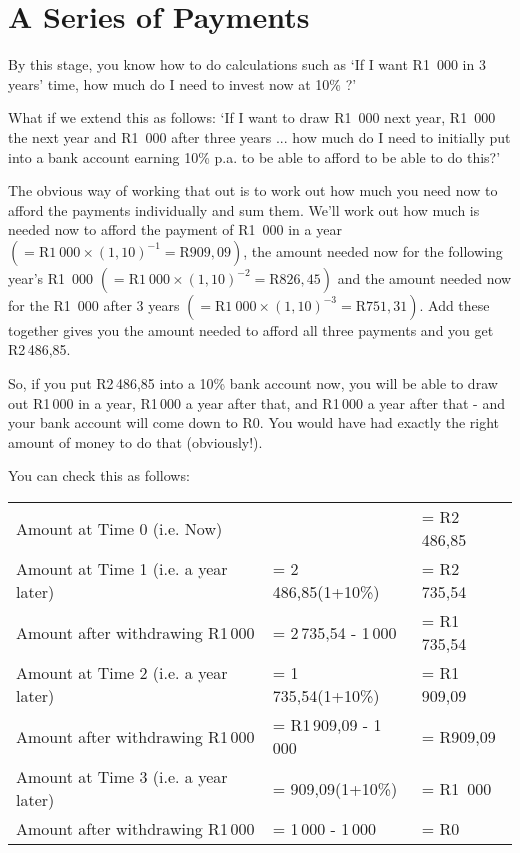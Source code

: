 \section{A Series of Payments}

By this stage, you know how to do calculations such as `If I want R1~000 in 3 years' time, how much do I need to invest now at 10\% ?'

What if we extend this as follows: `If I want to draw R1~000 next year, R1~000 the next year and R1~000 after three years ... how much do I need to initially put into a bank account earning 10\% p.a. to be able to afford to be able to do this?'

The obvious way of working that out is to work out how much you need now to afford the payments individually and sum them. We'll work out how much is needed now to afford the payment of R1~000 in a year $(= \textrm{R}1~000\times (1,10)^{-1} = \textrm{R}909,09)$, the amount needed now for the following year's R1~000 $(=\textrm{R}1~000\times (1,10)^{-2} = \textrm{R}826,45)$ and the amount needed now for the R1~000 after 3 years $(=\textrm{R}1~000\times (1,10)^{-3} =\textrm{R}751,31)$. Add these together gives you the amount needed to afford all three payments and you get R2\,486,85.

So, if you put R2\,486,85 into a 10\% bank account now, you will be able to draw out R1\,000 in a year, R1\,000 a year after that, and R1\,000 a year after that - and your bank account will come down to R0. You would have had exactly the right amount of money to do that (obviously!).

You can check this as follows:

\begin{tabular}{lll}
Amount at Time 0 (i.e. Now) &&= R2\,486,85\\
Amount at Time 1 (i.e. a year later) &= 2\,486,85(1+10\%) &= R2\,735,54\\
Amount after withdrawing R1\,000 &= 2\,735,54 - 1\,000 &= R1\,735,54\\
Amount at Time 2 (i.e. a year later) &= 1\,735,54(1+10\%) &= R1\,909,09\\
Amount after withdrawing R1\,000 &= R1\,909,09 - 1\,000 &= R909,09\\
Amount at Time 3 (i.e. a year later) &= 909,09(1+10\%) &= R1~000\\
Amount after withdrawing R1\,000 &= 1\,000 - 1\,000 &= R0\\
\end{tabular}

